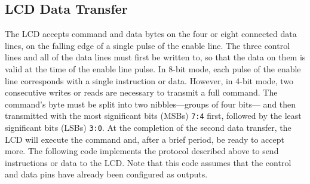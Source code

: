 \documentclass[
  9pt,
  letterpaper,
  abstract,
  titlepage]{scrbook}
\begin{document}
\subsection{LCD Data Transfer}\label{lcd-data-transfer}

The LCD accepts command and data bytes on the four or eight connected
data lines, on the falling edge of a single pulse of the enable line.
The three control lines and all of the data lines must first be written
to, so that the data on them is valid at the time of the enable line
pulse. In 8-bit mode, each pulse of the enable line corresponds with a
single instruction or data. However, in 4-bit mode, two consecutive
writes or reads are necessary to transmit a full command. The command's
byte must be split into two nibbles---groups of four bits--- and then
transmitted with the most significant bits (MSBs) \texttt{7:4} first,
followed by the least significant bits (LSBs) \texttt{3:0}. At the
completion of the second data transfer, the LCD will execute the command
and, after a brief period, be ready to accept more. The following code
implements the protocol described above to send instructions or data to
the LCD. Note that this code assumes that the control and data pins have
already been configured as outputs.
\end{document}
